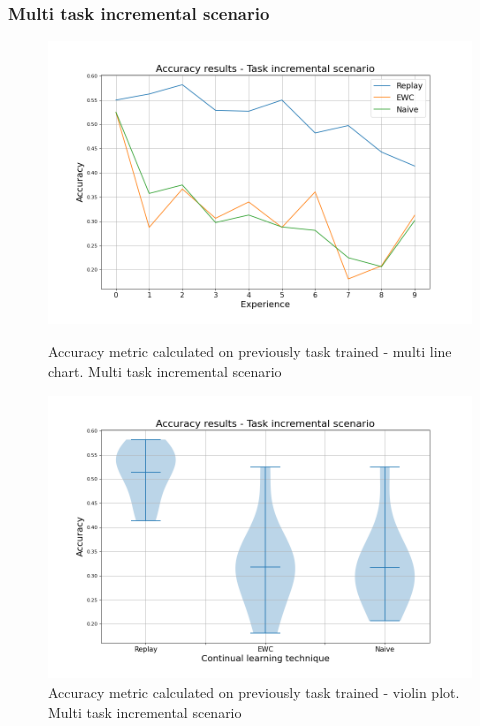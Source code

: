 \documentclass[english, LaM, oneside]{sapthesis}%
\begin{document}
\subsubsection{Multi task incremental scenario}
\begin{figure}[!h]
   \begin{minipage}{0.48\textwidth}
     \centering
     \includegraphics[width=1.1\linewidth]{overview_accuracy_before_nc.png}
     \caption{Accuracy metric calculated on previously task trained - multi line chart. Multi task incremental scenario}\label{Fig:92}
   \end{minipage}\hfill
   \begin{minipage}{0.48\textwidth}
     \centering
     \includegraphics[width=1.1\linewidth]{overview2_accuracy_before_nc.png}
     \caption{Accuracy metric calculated on previously task trained - violin plot. Multi task incremental scenario}\label{Fig:91}
   \end{minipage}
\end{figure}
\end{document}
